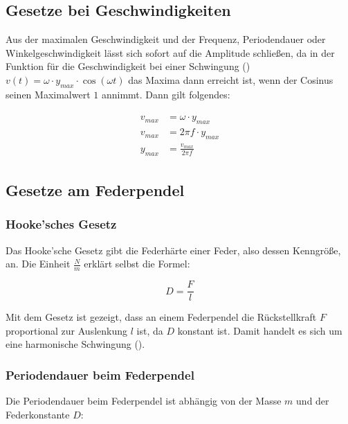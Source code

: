 \subsection{Gesetze bei Geschwindigkeiten}

Aus der maximalen Geschwindigkeit und der Frequenz, Periodendauer oder Winkelgeschwindigkeit lässt sich sofort auf die Amplitude schließen, da in der Funktion für die Geschwindigkeit bei einer Schwingung () $v(t)=\omega \cdot y_{max} \cdot \cos{(\omega t)}$ das Maxima dann erreicht ist, wenn der Cosinus seinen Maximalwert $1$ annimmt. Dann gilt folgendes:

\begin{align} \label{eq:geschwindigkeit_amplitude}
\begin{split}
	v_{max} &= \omega \cdot y_{max} \\
	v_{max} &= 2\pi f \cdot y_{max} \\
	y_{max} &= \frac{v_{max}}{2\pi f}
\end{split}
\end{align}


\subsection{Gesetze am Federpendel} \label{subsec:gesetze_federpendel}

\subsubsection{Hooke'sches Gesetz}

Das Hooke'sche Gesetz gibt die Federhärte einer Feder, also dessen Kenngröße, an. Die Einheit $\frac{N}{m}$ erklärt selbst die Formel:

\begin{equation}
	D=\frac{F}{l}
\end{equation}

Mit dem Gesetz ist gezeigt, dass an einem Federpendel die Rückstellkraft $F$ proportional zur Auslenkung $l$ ist, da $D$ konstant ist. Damit handelt es sich um eine harmonische Schwingung ().

\subsubsection{Periodendauer beim Federpendel}

Die Periodendauer beim Federpendel ist abhängig von der Masse $m$ und der Federkonstante $D$:

